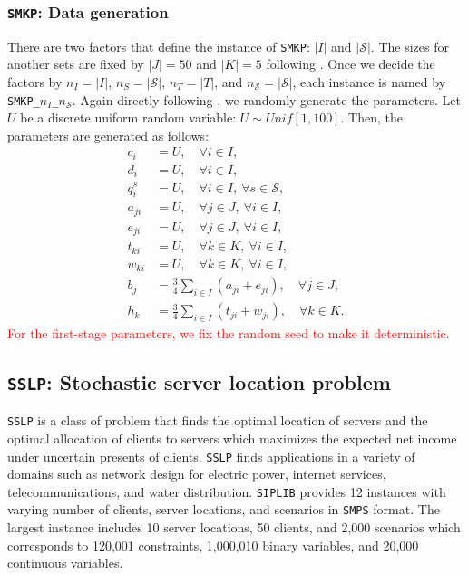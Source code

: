 \subsubsection{\texttt{SMKP}: Data generation}
There are two factors that define the instance of \texttt{SMKP}: $|I|$ and $|\mathcal{S}|$. The sizes for another sets are fixed by $|J|=50$ and $|K|=5$ following \cite{journal:AAD2014}. Once we decide the factors by $n_I=|I|$, $n_S=|\mathcal{S}|$, $n_T=|T|$, and $n_\mathcal{S}=|\mathcal{S}|$, each instance is named by \texttt{SMKP\_$n_I$\_$n_\mathcal{S}$}. Again directly following \cite{journal:AAD2014}, we randomly generate the parameters. Let $U$ be a discrete uniform random variable: $U\sim Unif[1,100]$. Then, the parameters are generated as follows:
\begin{align*}
c_i		&=	U,\quad\forall i\in I, \\
d_i		&=	U,\quad\forall i\in I, \\
q_i^s	&= 	U,\quad\forall i\in I,\ \forall s\in\mathcal{S},\\
a_{ji}	&=	U,\quad\forall j\in J,\ \forall i\in I, \\
e_{ji}	&=	U,\quad\forall j\in J,\ \forall i\in I, \\
t_{ki}	&=	U,\quad\forall k\in K,\ \forall i\in I, \\
w_{ki}	&=	U,\quad\forall k\in K,\ \forall i\in I,  \\
b_j		&=	\frac{3}{4}\sum_{i\in I}\left(a_{ji}+e_{ji}\right),\quad\forall j\in J, \\
h_k		&=	\frac{3}{4}\sum_{i\in I}\left(t_{ji}+w_{ji}\right),\quad\forall k\in K. 
\end{align*}
\textcolor{red}{For the first-stage parameters, we fix the random seed to make it deterministic.}

\subsection{\texttt{SSLP}: Stochastic server location problem}
\texttt{SSLP} is a class of problem that finds the optimal location of servers and the optimal allocation of clients to servers which maximizes the expected net income under uncertain presents of clients. \texttt{SSLP} finds applications in a variety of domains such as network design for electric power, internet services, telecommunications, and water distribution. \texttt{SIPLIB} provides 12 instances with varying number of clients, server locations, and scenarios in \texttt{SMPS} format. The largest instance includes 10 server locations, 50 clients, and 2,000 scenarios which corresponds to 120,001 constraints, 1,000,010 binary variables, and 20,000 continuous variables.

